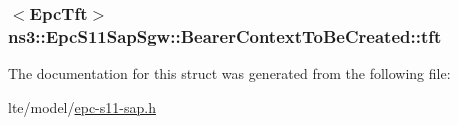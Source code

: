 \subsubsection[{\texorpdfstring{tft}{tft}}]{$<${\bf Epc\+Tft}$>$ ns3\+::\+Epc\+S11\+Sap\+Sgw\+::\+Bearer\+Context\+To\+Be\+Created\+::tft}\hypertarget{structns3_1_1EpcS11SapSgw_1_1BearerContextToBeCreated_ac3ca36bce692f0d7dae63354f33fdb49}{}\label{structns3_1_1EpcS11SapSgw_1_1BearerContextToBeCreated_ac3ca36bce692f0d7dae63354f33fdb49}


The documentation for this struct was generated from the following file\+:\begin{DoxyCompactItemize}
\item 
lte/model/\hyperlink{epc-s11-sap_8h}{epc-\/s11-\/sap.\+h}\end{DoxyCompactItemize}
